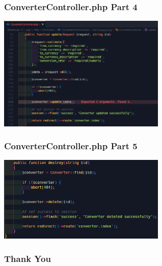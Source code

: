 \documentclass[aspectratio=169, table]{beamer}
\begin{document}
\begin{frame}[fragile]
 \frametitle{ConverterController.php Part 4}
 \vskip1cm
 \begin{center}
  \includegraphics[width=0.6\textwidth]{classFiles/pertemuan-12-controller-part-4.png}
 \end{center}
\end{frame}

\begin{frame}[fragile]
 \frametitle{ConverterController.php Part 5}
 \vskip1cm
 \begin{center}
  \includegraphics[width=0.6\textwidth]{classFiles/pertemuan-12-controller-part-5.png}
 \end{center}
\end{frame}

\begin{frame4}
    \frametitle{Thank You}
\end{frame4}
\end{document}
